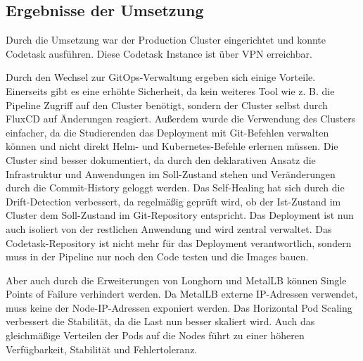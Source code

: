 \subsection{Ergebnisse der Umsetzung}
Durch die Umsetzung war der Production Cluster eingerichtet und konnte Codetask ausführen. Diese Codetask Instance ist über VPN erreichbar.

Durch den Wechsel zur GitOps-Verwaltung ergeben sich einige Vorteile.
Einerseits gibt es eine erhöhte Sicherheit, da kein weiteres Tool wie z. B. die Pipeline Zugriff auf den Cluster benötigt, sondern der Cluster selbst durch FluxCD auf Änderungen reagiert.
Außerdem wurde die Verwendung des Clusters einfacher, da die Studierenden das Deployment mit Git-Befehlen verwalten können und nicht direkt Helm- und Kubernetes-Befehle erlernen müssen.
Die Cluster sind besser dokumentiert, da durch den deklarativen Ansatz die Infrastruktur und Anwendungen im Soll-Zustand stehen und Veränderungen durch die Commit-History geloggt werden.
Das Self-Healing hat sich durch die Drift-Detection verbessert, da regelmäßig geprüft wird, ob der Ist-Zustand im Cluster dem Soll-Zustand im Git-Repository entspricht. 
Das Deployment ist nun auch isoliert von der restlichen Anwendung und wird zentral verwaltet. Das Codetask-Repository ist nicht mehr für das Deployment verantwortlich, sondern muss in der Pipeline nur noch den Code testen und die Images bauen.

Aber auch durch die Erweiterungen von Longhorn und MetalLB können Single Points of Failure verhindert werden. Da MetalLB externe IP-Adressen verwendet, muss keine der Node-IP-Adressen exponiert werden.
Das Horizontal Pod Scaling verbessert die Stabilität, da die Last nun besser skaliert wird. 
Auch das gleichmäßige Verteilen der Pods auf die Nodes führt zu einer höheren Verfügbarkeit, Stabilität und Fehlertoleranz.